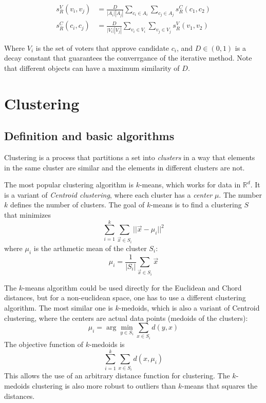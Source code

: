 \documentclass[en]{pracamgr}
\begin{document}
\begin{align*}
  s_R^V(v_i, v_j) &= \frac{D}{|A_i||A_j|} \sum_{c_i \in A_i} \sum_{c_j \in A_j} s_R^C(c_1, c_2) \\
  s_R^C(c_i, c_j) &= \frac{D}{|V_i||V_j|} \sum_{v_i \in V_i} \sum_{v_j \in V_j} s_R^V(v_1, v_2)
\end{align*}

Where $V_i$ is the set of voters that approve candidate $c_i$, and $D \in (0,1)$
is a decay constant that guarantees the converrgance of the iterative method.
Note that different objects can have a maximum similarity of $D$.


\section{Clustering}

\subsection{Definition and basic algorithms}

Clustering is a process that partitions a set into \textit{clusters} in a way
that elements in the same cluster are similar and the elements in different
clusters are not.

The most popular clustering algorithm is $k$-means, which works for data in
$\mathbb R^d$. It is a variant of \textit{Centroid clustering}, where each
cluster has a \textit{center} $\mu$. The number $k$ defines the number of
clusters. The goal of $k$-means is to find a clustering $S$ that minimizes
\[ \sum_{i=1}^k \sum_{\vec x \in S_i} ||\vec x - \mu_i||^2 \]
where $\mu_i$ is the arthmetic mean of the cluster $S_i$:
\[ \mu_i = \frac{1}{|S_i|} \sum\limits_{\vec x \in S_i}\vec x \]

The $k$-means algorithm could be used directly for the Euclidean and Chord
distances, but for a non-euclidean space, one has to use a different clustering
algorithm. The most similar one is $k$-medoids, which is also a variant of
Centroid clustering, where the centers are actual data points (medoids of the
clusters):
\[ \mu_i = \arg\min_{y \in S_i} \sum_{x \in S_i}d(y,x) \]
The objective function of $k$-medoids is
\[ \sum_{i=1}^k \sum_{x \in S_i} d(x,\mu_i) \]
This allows the use of an arbitrary distance function for clustering. The
$k$-medoids clustering is also more robust to outliers than $k$-means that
squares the distances.
\end{document}
